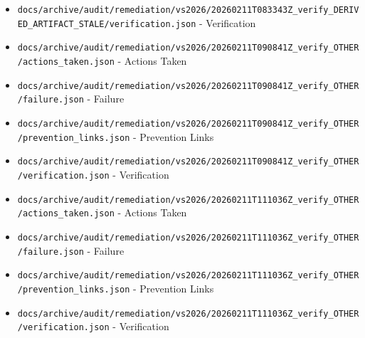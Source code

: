 \documentclass[10.5pt,a4paper,openany]{book}
\begin{document}
\begin{itemize}
\item \texttt{docs/\allowbreak{}archive/\allowbreak{}audit/\allowbreak{}remediation/\allowbreak{}vs2026/\allowbreak{}20260211T083343Z\_\allowbreak{}verify\_\allowbreak{}DERIVED\_\allowbreak{}ARTIFACT\_\allowbreak{}STALE/\allowbreak{}verification.\allowbreak{}json} -\allowbreak{} Verification
\item \texttt{docs/\allowbreak{}archive/\allowbreak{}audit/\allowbreak{}remediation/\allowbreak{}vs2026/\allowbreak{}20260211T090841Z\_\allowbreak{}verify\_\allowbreak{}OTHER/\allowbreak{}actions\_\allowbreak{}taken.\allowbreak{}json} -\allowbreak{} Actions Taken
\item \texttt{docs/\allowbreak{}archive/\allowbreak{}audit/\allowbreak{}remediation/\allowbreak{}vs2026/\allowbreak{}20260211T090841Z\_\allowbreak{}verify\_\allowbreak{}OTHER/\allowbreak{}failure.\allowbreak{}json} -\allowbreak{} Failure
\item \texttt{docs/\allowbreak{}archive/\allowbreak{}audit/\allowbreak{}remediation/\allowbreak{}vs2026/\allowbreak{}20260211T090841Z\_\allowbreak{}verify\_\allowbreak{}OTHER/\allowbreak{}prevention\_\allowbreak{}links.\allowbreak{}json} -\allowbreak{} Prevention Links
\item \texttt{docs/\allowbreak{}archive/\allowbreak{}audit/\allowbreak{}remediation/\allowbreak{}vs2026/\allowbreak{}20260211T090841Z\_\allowbreak{}verify\_\allowbreak{}OTHER/\allowbreak{}verification.\allowbreak{}json} -\allowbreak{} Verification
\item \texttt{docs/\allowbreak{}archive/\allowbreak{}audit/\allowbreak{}remediation/\allowbreak{}vs2026/\allowbreak{}20260211T111036Z\_\allowbreak{}verify\_\allowbreak{}OTHER/\allowbreak{}actions\_\allowbreak{}taken.\allowbreak{}json} -\allowbreak{} Actions Taken
\item \texttt{docs/\allowbreak{}archive/\allowbreak{}audit/\allowbreak{}remediation/\allowbreak{}vs2026/\allowbreak{}20260211T111036Z\_\allowbreak{}verify\_\allowbreak{}OTHER/\allowbreak{}failure.\allowbreak{}json} -\allowbreak{} Failure
\item \texttt{docs/\allowbreak{}archive/\allowbreak{}audit/\allowbreak{}remediation/\allowbreak{}vs2026/\allowbreak{}20260211T111036Z\_\allowbreak{}verify\_\allowbreak{}OTHER/\allowbreak{}prevention\_\allowbreak{}links.\allowbreak{}json} -\allowbreak{} Prevention Links
\item \texttt{docs/\allowbreak{}archive/\allowbreak{}audit/\allowbreak{}remediation/\allowbreak{}vs2026/\allowbreak{}20260211T111036Z\_\allowbreak{}verify\_\allowbreak{}OTHER/\allowbreak{}verification.\allowbreak{}json} -\allowbreak{} Verification

\end{itemize}
\end{document}
